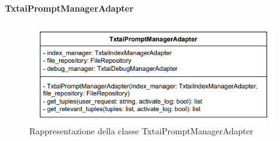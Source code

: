 \paragraph{TxtaiPromptManagerAdapter} \label{TxtaiPromptManagerAdapter}
\begin{figure}[H]
    \centering
    \includegraphics[width=0.95\textwidth]{assets/Backend/txtai_prompt_manager_adapter.png}
    \caption{Rappresentazione della classe TxtaiPromptManagerAdapter}
  \end{figure}
